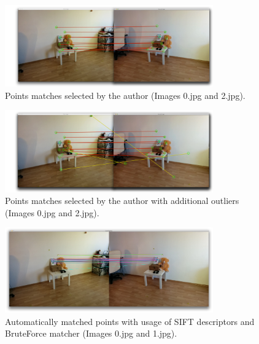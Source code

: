 \begin{figure}[h!]
    \centering
    \includegraphics[width=0.8\textwidth]{02_matching}
    \caption{Points matches selected by the author (Images 0.jpg and 2.jpg).}
    \label{fig:02_matching}
\end{figure}
\begin{figure}[h!]
    \centering
    \includegraphics[width=0.8\textwidth]{02_matching_outliers}
    \caption{Points matches selected by the author with additional outliers (Images 0.jpg and 2.jpg).}
    \label{fig:02_matching_outliers}
\end{figure}

\begin{figure}[h!]
    \centering
    \includegraphics[width=0.8\textwidth]{f_02_auto_sift}
    \caption{Automatically matched points with usage of SIFT descriptors and BruteForce matcher (Images 0.jpg and 1.jpg).}
    \label{fig:f_02_auto_sift}
\end{figure}


